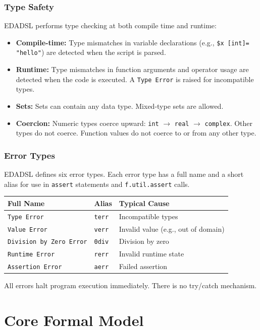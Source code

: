 \section{Type Safety}
EDADSL performs type checking at both compile time and runtime:

\begin{itemize}
\item \textbf{Compile-time:} Type mismatches in variable declarations (e.g., \texttt{\$x [int]= "hello"}) are detected when the script is parsed.
\item \textbf{Runtime:} Type mismatches in function arguments and operator usage are detected when the code is executed. A \texttt{Type Error} is raised for incompatible types.
\item \textbf{Sets:} Sets can contain any data type. Mixed-type sets are allowed.
\item \textbf{Coercion:} Numeric types coerce upward: \texttt{int} $\to$ \texttt{real} $\to$ \texttt{complex}. Other types do not coerce. Function values do not coerce to or from any other type.
\end{itemize}

\section{Error Types}
EDADSL defines six error types. Each error type has a full name and a short alias for use in \texttt{assert} statements and \texttt{f.util.assert} calls.

\begin{center}
\begin{tabular}{lll}
Full Name & Alias & Typical Cause \\ \hline
\texttt{Type Error} & \texttt{terr} & Incompatible types \\
\texttt{Value Error} & \texttt{verr} & Invalid value (e.g., out of domain) \\
\texttt{Division by Zero Error} & \texttt{0div} & Division by zero \\
\texttt{Runtime Error} & \texttt{rerr} & Invalid runtime state \\
\texttt{Assertion Error} & \texttt{aerr} & Failed assertion \\
\end{tabular}
\end{center}

All errors halt program execution immediately. There is no try/catch mechanism.\part{Core Formal Model}

